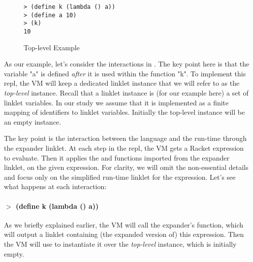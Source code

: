 \begin{wrapfigure}[7]{r}{0.3\textwidth}
  \vspace{-0.7cm}
  \begin{mdframed}
    \begin{verbatim}
> (define k (lambda () a))
> (define a 10)
> (k)
10
\end{verbatim}
    \caption{Top-level Example}
    \label{fig:toplevel-interaction}
  \end{mdframed}
\end{wrapfigure}

As our example, let's consider the interactions in
. The key point here is that the
variable "a" is defined \emph{after} it is used within the function
"k". To implement this repl, the VM will keep a dedicated linklet
instance that we will refer to as the \emph{top-level}
instance. Recall that a linklet instance is (for our example here) a
set of linklet variables. In our study we assume that it is
implemented as a finite mapping of identifiers to linklet
variables. Initially the top-level instance will be an empty instance.

The key point is the interaction between the language and the run-time
through the expander linklet. At each step in the repl, the VM gets a
Racket expression to evaluate. Then it applies the 
and  functions imported from the expander linklet,
on the given expression. For clarity, we will omit the non-essential
details and focus only on the simplified run-time linklet for the
expression. Let's see what happens at each interaction:

\paragraph{$>$ (define k (lambda () a))}

As we briefly explained earlier, the VM will call the expander's
 function, which will output a linklet containing (the
expanded version of) this expression. Then the VM will use
 to instantiate it over the \emph{top-level}
instance, which is initially empty.

